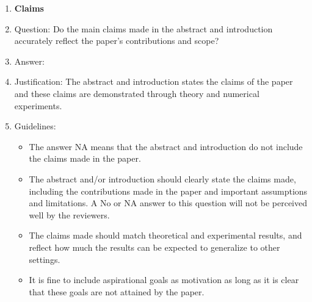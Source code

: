 \documentclass{article}
\theoremstyle{definition} \newtheorem{definition}{Definition}  \newtheorem{example}{Example}
\theoremstyle{remark} \newtheorem{remark}{Remark}
\newcounter{ct}
\begin{document}
\begin{enumerate}

\item {\bf Claims}
    \item[] Question: Do the main claims made in the abstract and introduction accurately reflect the paper's contributions and scope?
    \item[] Answer: \answerYes{} %
    \item[] Justification: The abstract and introduction states the claims of the paper and these claims are demonstrated through theory and numerical experiments.
    \item[] Guidelines:
    \begin{itemize}
        \item The answer NA means that the abstract and introduction do not include the claims made in the paper.
        \item The abstract and/or introduction should clearly state the claims made, including the contributions made in the paper and important assumptions and limitations. A No or NA answer to this question will not be perceived well by the reviewers. 
        \item The claims made should match theoretical and experimental results, and reflect how much the results can be expected to generalize to other settings. 
        \item It is fine to include aspirational goals as motivation as long as it is clear that these goals are not attained by the paper. 
    \end{itemize}


\end{enumerate}
\end{document}
